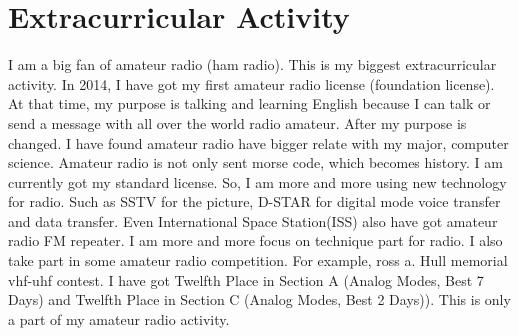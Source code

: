 \documentclass[]{friggeri-cv}
\begin{document}
\section{Extracurricular Activity}
I am a big fan of amateur radio (ham radio).
This is my biggest extracurricular activity.
In 2014, I have got my first amateur radio license (foundation license).
At that time, my purpose is talking and learning English because I can talk or send a message with all over the world radio amateur.
After my purpose is changed. I have found amateur radio have bigger relate with my major, computer science.
Amateur radio is not only sent morse code, which becomes history.
I am currently got my standard license.
So, I am more and more using new technology for radio.
Such as SSTV for the picture, D-STAR for digital mode voice transfer and data transfer.
Even International Space Station(ISS) also have got amateur radio FM repeater.
I am more and more focus on technique part for radio.
I also take part in some amateur radio competition.
For example, ross a. Hull memorial vhf-uhf contest.
I have got Twelfth Place in Section A (Analog Modes, Best 7 Days) and Twelfth Place in Section C (Analog Modes, Best 2 Days)).
This is only a part of my amateur radio activity.
\end{document}
